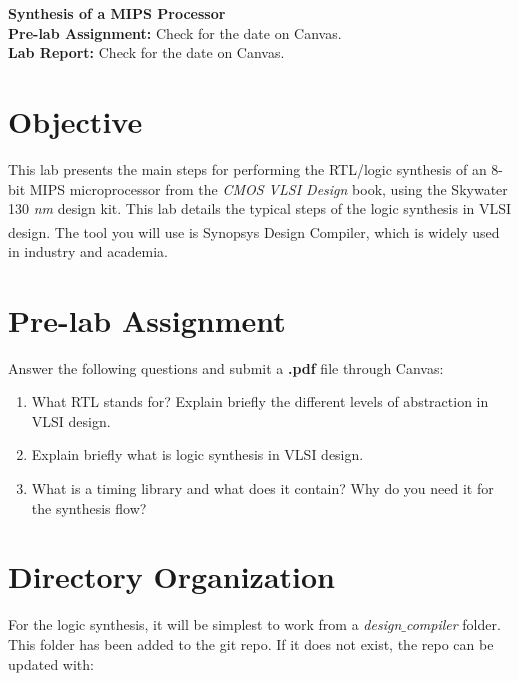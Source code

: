 \newcommand{\labtitle}{ECE/CS 5710/6710 - Lab 3}
\newcommand{\labsubtitle}{Synthesis of a MIPS Processor}
\vlsiheader

\begin{center}
\LARGE\textbf{\labsubtitle} \\
	\large\textbf{Pre-lab Assignment:} Check for the date on Canvas. \\
	\large\textbf{Lab Report:} Check for the date on Canvas.
\end{center}
\section{Objective}
This lab presents the main steps for performing the RTL/logic synthesis of an 8-bit MIPS microprocessor from the \textit{CMOS VLSI Design} book, using the Skywater 130 \emph{nm} design kit. This lab details the typical steps of the logic synthesis in VLSI design. The tool you will use is Synopsys Design Compiler\textsuperscript{\tiny\textregistered}, which is widely used in industry and academia. 



\section{Pre-lab Assignment}
\begin{prelab}
	Answer the following questions and submit a \textbf{.pdf} file through Canvas:
 \begin{enumerate}
 	\item What RTL stands for? Explain briefly the different levels of abstraction in VLSI design.
 	\item Explain briefly what is logic synthesis in VLSI design.
 	\item What is a timing library and what does it contain? Why do you need it for the synthesis flow?
 \end{enumerate}
\vspace{-5mm}
\end{prelab}


\section{Directory Organization}

For the logic synthesis, it will be simplest to work from a \textit{design$\_$compiler} folder. This folder has been added to the git repo. If it does not exist, the repo can be updated with:

